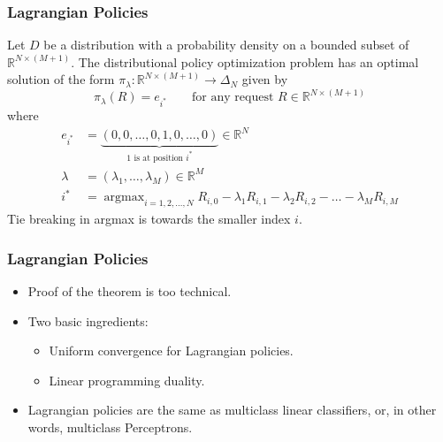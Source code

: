 \documentclass[usenames,dvipsnames]{beamer}
\DeclareMathOperator*{\argmax}{argmax}
\newcommand{\R}{\mathbb{R}}
\begin{document}
\begin{frame}
\frametitle{Lagrangian Policies}

\begin{theorem}
Let $D$ be a distribution with a probability density on a bounded subset of
$\R^{N \times (M+1)}$. The distributional policy optimization problem has an
optimal solution of the form $\pi_\lambda:\R^{N \times (M+1)} \to \Delta_N$
given by
$$
\pi_\lambda(R) = e_{i^*} \qquad \text{for any request $R \in \R^{N \times (M+1)}$}
$$
where
\begin{align*}
e_{i^*} & = \underbrace{(0,0,\dots,0,1,0,\dots,0)}_{\text{$1$ is at position  $i^*$}} \in \R^N \\
\lambda & = (\lambda_1, \dots, \lambda_M) \in \R^M \\
i^* & = \argmax_{i=1,2,\dots,N} R_{i,0} - \lambda_1 R_{i,1} - \lambda_2 R_{i,2} - \dots - \lambda_M R_{i,M}
\end{align*}
Tie breaking in argmax is towards the smaller index $i$.
\end{theorem}
\end{frame}

\begin{frame}
\frametitle{Lagrangian Policies}

\begin{itemize}
\item Proof of the theorem is too technical.
\item Two basic ingredients:
\begin{itemize}
\item Uniform convergence for Lagrangian policies.
\item Linear programming duality.
\end{itemize}
\item Lagrangian policies are the same as multiclass linear classifiers, or, in other words, multiclass Perceptrons.
\end{itemize}

\end{frame}
\end{document}

